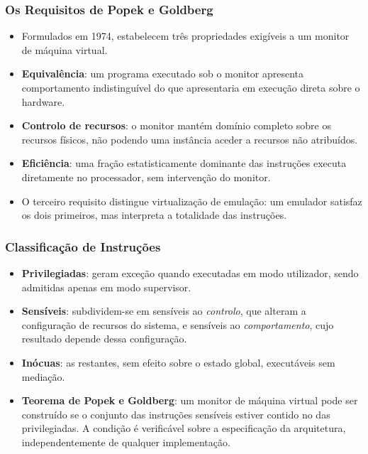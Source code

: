 \documentclass[aspectratio=169]{beamer}
\begin{document}
\begin{frame}
\frametitle{Os Requisitos de Popek e Goldberg}
\begin{itemize}
    \setlength\itemsep{0.4cm}
    \item Formulados em 1974, estabelecem três propriedades exigíveis a um monitor de máquina virtual.
    \item \textbf{Equivalência}: um programa executado sob o monitor apresenta comportamento indistinguível do que apresentaria em execução direta sobre o hardware.
    \item \textbf{Controlo de recursos}: o monitor mantém domínio completo sobre os recursos físicos, não podendo uma instância aceder a recursos não atribuídos.
    \item \textbf{Eficiência}: uma fração estatisticamente dominante das instruções executa diretamente no processador, sem intervenção do monitor.
    \item O terceiro requisito distingue virtualização de emulação: um emulador satisfaz os dois primeiros, mas interpreta a totalidade das instruções.
\end{itemize}
\end{frame}

\begin{frame}
\frametitle{Classificação de Instruções}
\begin{itemize}
    \setlength\itemsep{0.35cm}
    \item \textbf{Privilegiadas}: geram exceção quando executadas em modo utilizador, sendo admitidas apenas em modo supervisor.
    \item \textbf{Sensíveis}: subdividem-se em sensíveis ao \emph{controlo}, que alteram a configuração de recursos do sistema, e sensíveis ao \emph{comportamento}, cujo resultado depende dessa configuração.
    \item \textbf{Inócuas}: as restantes, sem efeito sobre o estado global, executáveis sem mediação.
    \item \textbf{Teorema de Popek e Goldberg}: um monitor de máquina virtual pode ser construído se o conjunto das instruções sensíveis estiver contido no das privilegiadas. A condição é verificável sobre a especificação da arquitetura, independentemente de qualquer implementação.
\end{itemize}
\end{frame}
\end{document}
